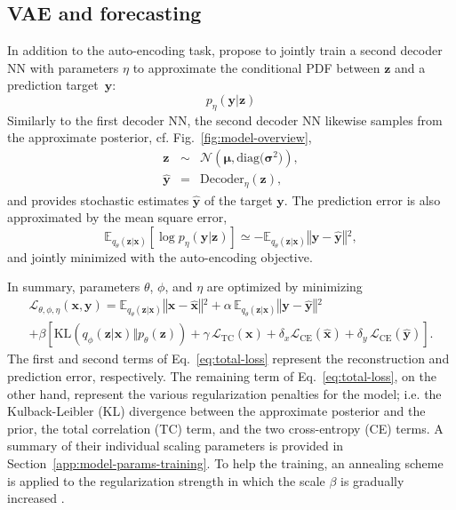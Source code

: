 \documentclass[english,a4paper,10pt]{scrartcl}
\begin{document}
\subsection{VAE and forecasting}

In addition to the auto-encoding task, \cite{Groth.Chavez.2023} propose to jointly train a second decoder NN with parameters $\eta$ to approximate the conditional PDF between $\mathbf{z}$ and a prediction target~$\mathbf{y}$:
\begin{equation}
    p_{\eta}(\mathbf{y}|\mathbf{z})\label{eq:prediction-pdf}
\end{equation}
Similarly to the first decoder NN, the second decoder NN likewise samples from the approximate posterior, cf. Fig.~\ref{fig:model-overview},
\begin{subequations}
    \begin{eqnarray}
        \mathbf{z} & \sim & \mathcal{N}\left(\boldsymbol{\mu},\mathrm{diag(}\boldsymbol{\boldsymbol{\sigma}}^{2})\right),\\
        \hat{\mathbf{y}} & = & \mathrm{Decoder}_{\eta}(\mathbf{z}),\label{eq:prediction-NN}
    \end{eqnarray}
\end{subequations}
and provides stochastic estimates $\hat{\mathbf{y}}$ of the target $\mathbf{y}$. The prediction error is also approximated by the mean square error,
\begin{equation}
    \mathbb{E}_{q_{\theta}(\mathbf{z}|\mathbf{x})}\left[\log p_{\eta}(\mathbf{y}|\mathbf{z})\right]\simeq-\mathbb{E}_{q_{\theta}(\mathbf{z}|\mathbf{x})}\left\Vert \mathbf{y}-\hat{\mathbf{y}}\right\Vert {}^{2},\label{eq:MSE-y}
\end{equation}
and jointly minimized with the auto-encoding objective.

In summary, parameters $\theta$, $\phi$, and $\eta$ are optimized by minimizing
\begin{multline}
    \mathcal{L}{}_{\theta,\phi,\eta}(\mathbf{x},\mathbf{y})=\mathbb{E}_{q_{\theta}(\mathbf{z}|\mathbf{x})}\left\Vert \mathbf{x}-\hat{\mathbf{x}}\right\Vert {}^{2}+\alpha\,\mathbb{E}_{q_{\theta}(\mathbf{z}|\mathbf{x})}\left\Vert \mathbf{y}-\hat{\mathbf{y}}\right\Vert {}^{2}\\
    +\beta\left[\mathrm{KL}\left(q_{\phi}(\mathbf{z}|\mathbf{x})\Vert p_{\theta}(\mathbf{z})\right)+\gamma\,\mathcal{L}_{\mathrm{TC}}(\mathbf{x})+\delta_{x}\mathcal{L}_{\mathrm{CE}}(\hat{\mathbf{x}})+\delta_{y}\,\mathcal{L}_{\mathrm{CE}}(\mathbf{\hat{y}})\right].\label{eq:total-loss}
\end{multline}
The first and second terms of Eq.~\eqref{eq:total-loss} represent the reconstruction and prediction error, respectively. The remaining term of Eq.~\eqref{eq:total-loss}, on the other hand, represent the various regularization penalties for the model; i.e. the Kulback-Leibler (KL) divergence between the approximate posterior and the prior,
the total correlation (TC) term, and the two cross-entropy (CE) terms. A summary of their individual scaling parameters is provided in Section~\ref{app:model-params-training}. To help the training, an annealing scheme is applied to the regularization strength in which the scale $\beta$ is gradually increased \citep{Bowman.Vilnis.ea.2015}.
\end{document}
